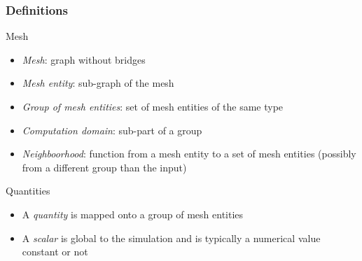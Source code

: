\documentclass{beamer}
\begin{document}
\begin{frame}
\frametitle{Definitions}
\begin{block}{Mesh}
\begin{itemize}
\item \textit{Mesh}: graph without bridges
\item \textit{Mesh entity}: sub-graph of the mesh
\item \textit{Group of mesh entities}: set of mesh entities of the same type
\item \textit{Computation domain}: sub-part of a group
\item \textit{Neighboorhood}: function from a mesh entity to a set of mesh entities (possibly from a different group than the input)
\end{itemize}
\end{block}

\begin{block}{Quantities}
\begin{itemize}
\item A \textit{quantity} is mapped onto a group of mesh entities
\item A \textit{scalar} is global to the simulation and is typically a numerical value constant or not
\end{itemize}
\end{block}
\end{frame}
\end{document}
